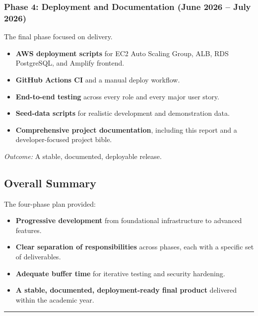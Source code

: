 \subsubsection{Phase 4: Deployment and Documentation (June 2026 -- July 2026)}

The final phase focused on delivery.
\begin{itemize}
    \item \textbf{AWS deployment scripts} for EC2 Auto Scaling Group, ALB, RDS PostgreSQL, and Amplify frontend.
    \item \textbf{GitHub Actions CI} and a manual deploy workflow.
    \item \textbf{End-to-end testing} across every role and every major user story.
    \item \textbf{Seed-data scripts} for realistic development and demonstration data.
    \item \textbf{Comprehensive project documentation}, including this report and a developer-focused project bible.
\end{itemize}
\textit{Outcome:} A stable, documented, deployable release.

\subsection{Overall Summary}

The four-phase plan provided:
\begin{itemize}
    \item \textbf{Progressive development} from foundational infrastructure to advanced features.
    \item \textbf{Clear separation of responsibilities} across phases, each with a specific set of deliverables.
    \item \textbf{Adequate buffer time} for iterative testing and security hardening.
    \item \textbf{A stable, documented, deployment-ready final product} delivered within the academic year.
\end{itemize}

\vspace{10mm}
\hrule

